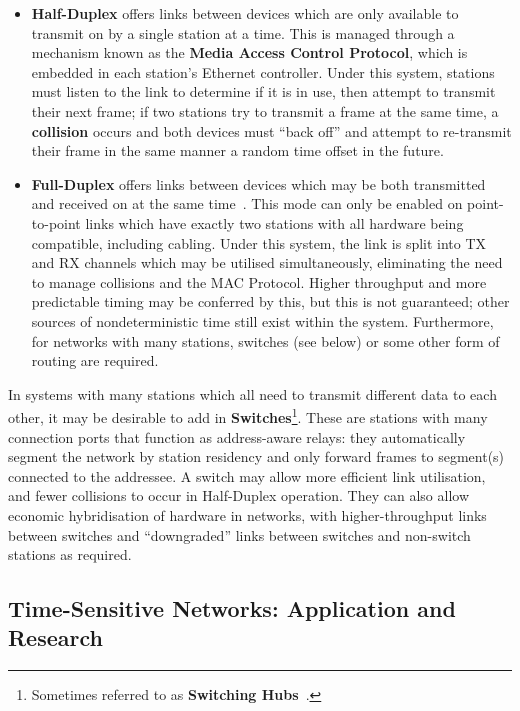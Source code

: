 \begin{itemize}
    \item \label{def:halfduplex} \textbf{Half-Duplex} offers links between devices which are only available to transmit on by a single station at a time.
        This is managed through a mechanism known as the \textbf{Media Access Control Protocol}, which is embedded in each station's Ethernet controller.
        Under this system, stations must listen to the link to determine if it is in use, then attempt to transmit their next frame; if two stations try to transmit a frame at the same time, a \textbf{collision} occurs and both devices must ``back off'' and attempt to re-transmit their frame in the same manner a random time offset in the future.
    \item \label{def:fullduplex} \textbf{Full-Duplex} offers links between devices which may be both transmitted and received on at the same time~\cite{spurgeonEthernetDefinitiveGuide2000}.
        This mode can only be enabled on point-to-point links which have exactly two stations with all hardware being compatible, including cabling.
        Under this system, the link is split into TX and RX channels which may be utilised simultaneously, eliminating the need to manage collisions and the MAC Protocol.
        Higher throughput and more predictable timing may be conferred by this, but this is not guaranteed; other sources of nondeterministic time still exist within the system.
        Furthermore, for networks with many stations, switches (see below) or some other form of routing are required.
\end{itemize}

In systems with many stations which all need to transmit different data to each other, it may be desirable to add in \textbf{Switches}\footnote{Sometimes referred to as \textbf{Switching Hubs}~\cite{spurgeonEthernetDefinitiveGuide2000}.}.
These are stations with many connection ports that function as address-aware relays: they automatically segment the network by station residency and only forward frames to segment(s) connected to the addressee\cite{spurgeonEthernetDefinitiveGuide2000}.
A switch may allow more efficient link utilisation, and fewer collisions to occur in Half-Duplex operation.
They can also allow economic hybridisation of hardware in networks, with higher-throughput links between switches and ``downgraded'' links between switches and non-switch stations as required.

\subsection{Time-Sensitive Networks: Application and Research}

